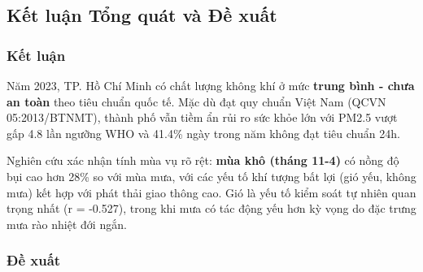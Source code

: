 \documentclass[12pt,a4paper]{article}
\begin{document}
\subsection{Kết luận Tổng quát và Đề xuất}

\subsubsection{Kết luận}

Năm 2023, TP. Hồ Chí Minh có chất lượng không khí ở mức \textbf{trung bình - chưa an toàn} theo tiêu chuẩn quốc tế. Mặc dù đạt quy chuẩn Việt Nam (QCVN 05:2013/BTNMT), thành phố vẫn tiềm ẩn rủi ro sức khỏe lớn với PM2.5 vượt gấp 4.8 lần ngưỡng WHO và 41.4\% ngày trong năm không đạt tiêu chuẩn 24h. 

Nghiên cứu xác nhận tính mùa vụ rõ rệt: \textbf{mùa khô (tháng 11-4)} có nồng độ bụi cao hơn 28\% so với mùa mưa, với các yếu tố khí tượng bất lợi (gió yếu, không mưa) kết hợp với phát thải giao thông cao. Gió là yếu tố kiểm soát tự nhiên quan trọng nhất (r = -0.527), trong khi mưa có tác động yếu hơn kỳ vọng do đặc trưng mưa rào nhiệt đới ngắn.

\subsubsection{Đề xuất}
\end{document}
